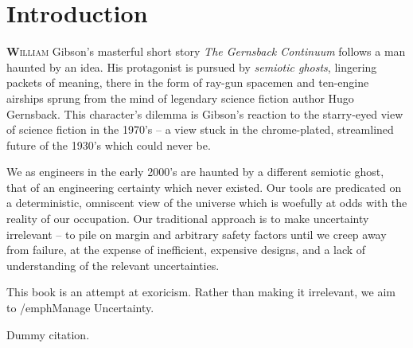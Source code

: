 \documentclass[../primer.tex]{subfiles}
\begin{document}
\chapter{Introduction}
\lettrine[findent=2pt]{\textbf{W}}{illiam} Gibson's masterful short story
\emph{The Gernsback Continuum}\cite{gibson1986chrome} follows a man haunted by
an idea. His protagonist is pursued by \emph{semiotic ghosts}, lingering packets
of meaning, there in the form of ray-gun spacemen and ten-engine airships sprung
from the mind of legendary science fiction author Hugo Gernsback. This
character's dilemma is Gibson's reaction to the starry-eyed view of science
fiction in the 1970's -- a view stuck in the chrome-plated, streamlined future
of the 1930's which could never be.

We as engineers in the early 2000's are haunted by a different semiotic ghost,
that of an engineering certainty which never existed. Our tools are predicated
on a deterministic, omniscent view of the universe which is woefully at odds
with the reality of our occupation. Our traditional approach is to make
uncertainty irrelevant -- to pile on margin and arbitrary safety factors until
we creep away from failure, at the expense of inefficient, expensive designs,
and a lack of understanding of the relevant uncertainties.

This book is an attempt at exoricism. Rather than making it irrelevant, we aim
to /emph{Manage Uncertainty}.

Dummy citation.\cite{shvartsman2016}
\end{document}
